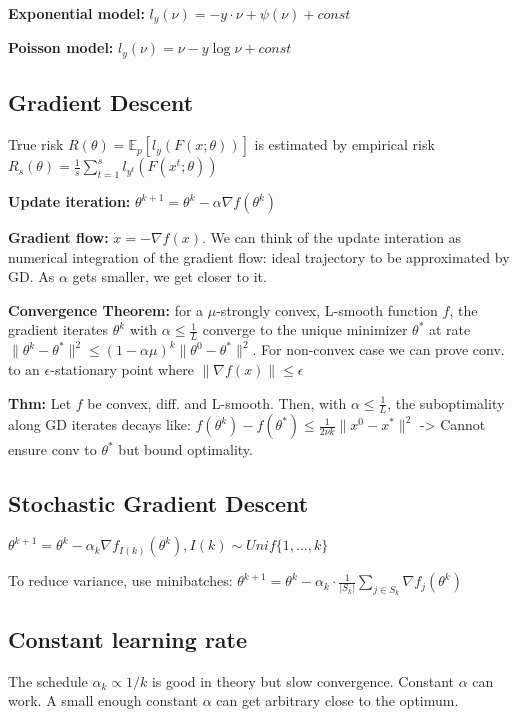 \textbf{Exponential model: } $l_y(\nu) = -y\cdot\nu + \psi(\nu) + const$

\textbf{Poisson model: } $l_y(\nu) = \nu - y\log\nu + const$

\subsection*{Gradient Descent}
True risk $R(\theta)=\mathbb{E}_p[l_y(F(x;\theta))]$ is estimated by empirical risk $R_s(\theta)=\frac{1}{s}\sum_{t=1}^s l_{y^{t}}(F(x^t;\theta))$

\textbf{Update iteration: } $\theta^{k+1} = \theta^k - \alpha\nabla f(\theta^k)$

\textbf{Gradient flow: } $\dot{x} = -\nabla f(x)$. We can think of the update interation as numerical integration of the gradient flow: ideal trajectory to be approximated by GD. As $\alpha$ gets smaller, we get closer to it.

\textbf{Convergence Theorem:} for a $\mu$-strongly convex, L-smooth function $f$, the gradient iterates $\theta^k$ with $\alpha\leq\frac{1}{L}$ converge to the unique minimizer $\theta^{*}$ at rate $\|\theta^k - \theta^{*}\|^2 \leq (1-\alpha\mu)^k\|\theta^0 - \theta^{*}\|^2$. For non-convex case we can prove conv. to an $\epsilon$-stationary point where $\|\nabla f(x)\| \leq \epsilon$

\textbf{Thm:} Let $f$ be convex, diff. and L-smooth. Then, with $\alpha\leq\frac{1}{L}$, the suboptimality along GD iterates decays like: $f(\theta^k) - f(\theta^*) \leq \frac{1}{2\nu k}\|x^0-x^*\|^2$ -> Cannot ensure conv to $\theta^*$ but bound optimality.

\subsection*{Stochastic Gradient Descent}
$\theta^{k+1} = \theta^k - \alpha_{k}\nabla f_{I(k)}(\theta^k), I(k) \sim Unif\{1,...,k\}$

To reduce variance, use minibatches: $\theta^{k+1} = \theta^k - \alpha_{k} \cdot \frac{1}{|S_k|}\sum_{j\in S_k}\nabla f_{j}(\theta^k)$

\subsection*{Constant learning rate}
The schedule $\alpha_k \propto 1/k$ is good in theory but slow convergence. Constant $\alpha$ can work. A small enough constant $\alpha$ can get arbitrary close to the optimum.

